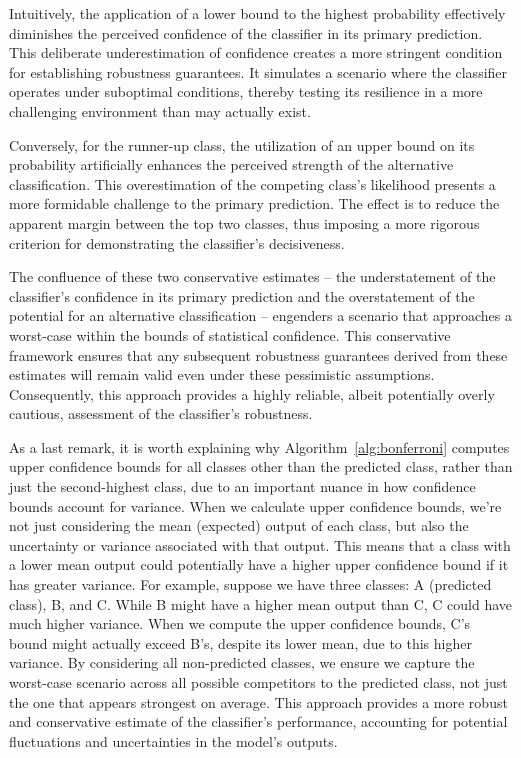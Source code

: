 Intuitively, the application of a lower bound to the highest probability effectively diminishes the perceived confidence of the classifier in its primary prediction.
This deliberate underestimation of confidence creates a more stringent condition for establishing robustness guarantees.
It simulates a scenario where the classifier operates under suboptimal conditions, thereby testing its resilience in a more challenging environment than may actually exist.

Conversely, for the runner-up class, the utilization of an upper bound on its probability artificially enhances the perceived strength of the alternative classification.
This overestimation of the competing class's likelihood presents a more formidable challenge to the primary prediction.
The effect is to reduce the apparent margin between the top two classes, thus imposing a more rigorous criterion for demonstrating the classifier's decisiveness.

The confluence of these two conservative estimates – the understatement of the classifier's confidence in its primary prediction and the overstatement of the potential for an alternative classification – engenders a scenario that approaches a worst-case within the bounds of statistical confidence.
This conservative framework ensures that any subsequent robustness guarantees derived from these estimates will remain valid even under these pessimistic assumptions.
Consequently, this approach provides a highly reliable, albeit potentially overly cautious, assessment of the classifier's robustness.

As a last remark, it is worth explaining why Algorithm~\ref{alg:bonferroni} computes upper confidence bounds for all classes other than the predicted class, rather than just the second-highest class, due to an important nuance in how confidence bounds account for variance.
When we calculate upper confidence bounds, we're not just considering the mean (expected) output of each class, but also the uncertainty or variance associated with that output.
This means that a class with a lower mean output could potentially have a higher upper confidence bound if it has greater variance.
For example, suppose we have three classes: A (predicted class), B, and C. While B might have a higher mean output than C, C could have much higher variance.
When we compute the upper confidence bounds, C's bound might actually exceed B's, despite its lower mean, due to this higher variance.
By considering all non-predicted classes, we ensure we capture the worst-case scenario across all possible competitors to the predicted class, not just the one that appears strongest on average.
This approach provides a more robust and conservative estimate of the classifier's performance, accounting for potential fluctuations and uncertainties in the model's outputs.

